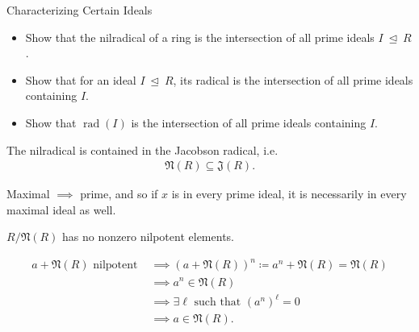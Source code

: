 Characterizing Certain Ideals

\begin{itemize}
\tightlist
\item
  Show that the nilradical of a ring is the intersection of all prime
  ideals \(I{~\trianglelefteq~}R\).
\item
  Show that for an ideal \(I{~\trianglelefteq~}R\), its radical is the
  intersection of all prime ideals containing \(I\).
\item
  Show that \({\operatorname{rad}}(I)\) is the intersection of all prime
  ideals containing \(I\).
\end{itemize}

\begin{problem}

The nilradical is contained in the Jacobson radical, i.e.
\begin{align*}
\mathfrak {\mathfrak{N}}(R) \subseteq {\mathfrak{J}}(R)
.\end{align*}

\end{problem}

\begin{solution}

Maximal \(\implies\) prime, and so if \(x\) is in every prime ideal, it
is necessarily in every maximal ideal as well.

\end{solution}

\begin{problem}

\(R/\mathfrak {\mathfrak{N}}(R)\) has no nonzero nilpotent elements.

\end{problem}

\begin{solution}

\hfill

\begin{align*}
a + \mathfrak N(R)\text{ nilpotent } &\implies (a+ \mathfrak N(R))^n \coloneqq a^n + \mathfrak N(R)= \mathfrak N(R) \\
&\implies a^n \in \mathfrak N(R) \\
&\implies \exists \ell \text{ such that } (a^n)^\ell = 0 \\
&\implies a\in \mathfrak N(R)
.
\end{align*}

\end{solution}


